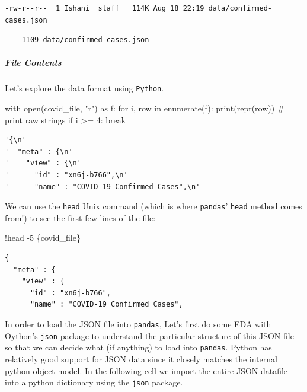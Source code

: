 \documentclass[
  letterpaper,
  DIV=11,
  numbers=noendperiod]{scrreprt}
\let\oldsubparagraph\subparagraph
\renewcommand{\subparagraph}[1]{\oldsubparagraph{#1}\mbox{}}
\newenvironment{Shaded}{\begin{snugshade}}{\end{snugshade}}
\newcommand{\BuiltInTok}[1]{\textcolor[rgb]{0.00,0.23,0.31}{#1}}
\newcommand{\CommentTok}[1]{\textcolor[rgb]{0.37,0.37,0.37}{#1}}
\newcommand{\ControlFlowTok}[1]{\textcolor[rgb]{0.00,0.23,0.31}{#1}}
\newcommand{\DecValTok}[1]{\textcolor[rgb]{0.68,0.00,0.00}{#1}}
\newcommand{\ImportTok}[1]{\textcolor[rgb]{0.00,0.46,0.62}{#1}}
\newcommand{\KeywordTok}[1]{\textcolor[rgb]{0.00,0.23,0.31}{#1}}
\newcommand{\NormalTok}[1]{\textcolor[rgb]{0.00,0.23,0.31}{#1}}
\newcommand{\OperatorTok}[1]{\textcolor[rgb]{0.37,0.37,0.37}{#1}}
\newcommand{\StringTok}[1]{\textcolor[rgb]{0.13,0.47,0.30}{#1}}
\begin{document}
\begin{verbatim}
-rw-r--r--  1 Ishani  staff   114K Aug 18 22:19 data/confirmed-cases.json
\end{verbatim}

\begin{verbatim}
    1109 data/confirmed-cases.json
\end{verbatim}

\hypertarget{file-contents}{%
\subparagraph{File Contents}\label{file-contents}}

Let's explore the data format using \texttt{Python}.

\begin{Shaded}
\begin{Highlighting}[]
\ControlFlowTok{with} \BuiltInTok{open}\NormalTok{(covid\_file, }\StringTok{"r"}\NormalTok{) }\ImportTok{as}\NormalTok{ f:}
    \ControlFlowTok{for}\NormalTok{ i, row }\KeywordTok{in} \BuiltInTok{enumerate}\NormalTok{(f):}
        \BuiltInTok{print}\NormalTok{(}\BuiltInTok{repr}\NormalTok{(row)) }\CommentTok{\# print raw strings}
        \ControlFlowTok{if}\NormalTok{ i }\OperatorTok{\textgreater{}=} \DecValTok{4}\NormalTok{: }\ControlFlowTok{break}
\end{Highlighting}
\end{Shaded}

\begin{verbatim}
'{\n'
'  "meta" : {\n'
'    "view" : {\n'
'      "id" : "xn6j-b766",\n'
'      "name" : "COVID-19 Confirmed Cases",\n'
\end{verbatim}

We can use the \texttt{head} Unix command (which is where
\texttt{pandas}' \texttt{head} method comes from!) to see the first few
lines of the file:

\begin{Shaded}
\begin{Highlighting}[]
\OperatorTok{!}\NormalTok{head }\OperatorTok{{-}}\DecValTok{5}\NormalTok{ \{covid\_file\}}
\end{Highlighting}
\end{Shaded}

\begin{verbatim}
{
  "meta" : {
    "view" : {
      "id" : "xn6j-b766",
      "name" : "COVID-19 Confirmed Cases",
\end{verbatim}

In order to load the JSON file into \texttt{pandas}, Let's first do some
EDA with Oython's \texttt{json} package to understand the particular
structure of this JSON file so that we can decide what (if anything) to
load into \texttt{pandas}. Python has relatively good support for JSON
data since it closely matches the internal python object model. In the
following cell we import the entire JSON datafile into a python
dictionary using the \texttt{json} package.
\end{document}
